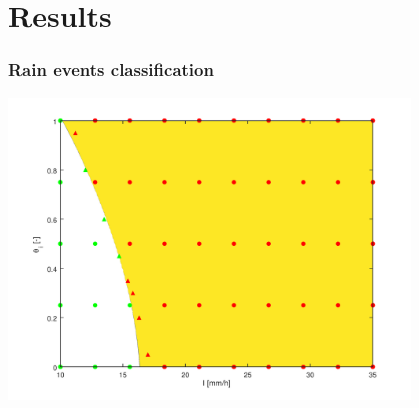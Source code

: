 \documentclass[xcolor=dvipsnames, USenglish]{beamer}  %
\begin{document}

\section{Results}
  \begin{frame}
    \frametitle{Rain events classification}
    \centering
    \includegraphics[width=0.8\textwidth]{img/classifier.png}
  \end{frame}

\end{document}
